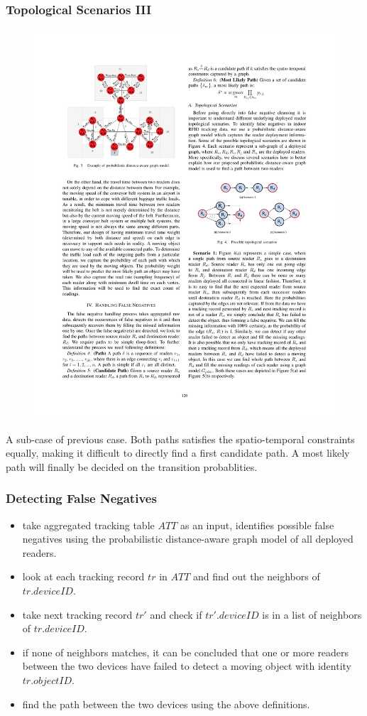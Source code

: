 \begin{frame}
\frametitle{Topological Scenarios III}

\begin{figure}[tb]
  \includegraphics[width=0.55\columnwidth]{figures/3-3/3-3-6.pdf}
\end{figure}
\vspace{-10pt}
A sub-case of previous case. Both paths satisfies the spatio-temporal constraints equally, making it difficult to directly find a first candidate path. A most likely path will finally be decided on the transition probablities.

\end{frame}


\begin{frame}
\frametitle{Detecting False Negatives}

\begin{itemize}

  \item take aggregated tracking table $ATT$ as an input, identifies possible false negatives using the probabilistic distance-aware graph model of all deployed readers.

  \item look at each tracking record $tr$ in $ATT$ and find out the neighbors of $tr.deviceID$.

  \item take next tracking record $tr'$ and check if $tr'.deviceID$ is in a list of neighbors of $tr.deviceID$.

  \item if none of neighbors matches, it can be concluded that one or more readers between the two devices have failed to detect a moving object with identity $tr.objectID$.

  \item find the path between the two devices using the above definitions.

\end{itemize}

\end{frame}

